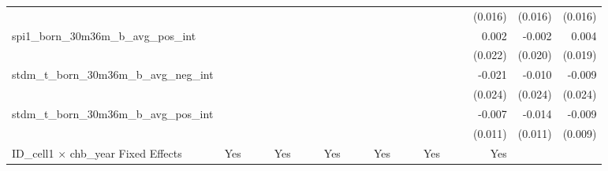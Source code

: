 \begin{tabular}{lrrrrrrrrrrrrrrrrrr}
                                            &              &              &              &              &              &              &              &              &               &              &              &               &              &              &               &      (0.016) &      (0.016) &       (0.016) \\ 
spi1\_born\_30m36m\_b\_avg\_pos\_int        &              &              &              &              &              &              &              &              &               &              &              &               &              &              &               &        0.002 &       -0.002 &         0.004 \\ 
                                            &              &              &              &              &              &              &              &              &               &              &              &               &              &              &               &      (0.022) &      (0.020) &       (0.019) \\ 
stdm\_t\_born\_30m36m\_b\_avg\_neg\_int     &              &              &              &              &              &              &              &              &               &              &              &               &              &              &               &       -0.021 &       -0.010 &        -0.009 \\ 
                                            &              &              &              &              &              &              &              &              &               &              &              &               &              &              &               &      (0.024) &      (0.024) &       (0.024) \\ 
stdm\_t\_born\_30m36m\_b\_avg\_pos\_int     &              &              &              &              &              &              &              &              &               &              &              &               &              &              &               &       -0.007 &       -0.014 &        -0.009 \\ 
                                            &              &              &              &              &              &              &              &              &               &              &              &               &              &              &               &      (0.011) &      (0.011) &       (0.009) \\ 
\midrule
ID\_cell1 $\times$ chb\_year Fixed Effects  &          Yes &              &              &          Yes &              &              &          Yes &              &               &          Yes &              &               &          Yes &              &               &          Yes &              &               \\ 

\end{tabular}
